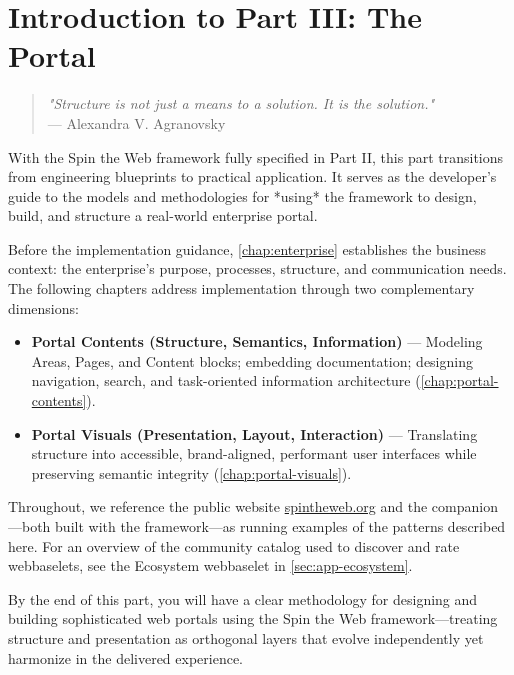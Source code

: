 \chapter*{Introduction to Part III: The Portal}
\label{part:implementation}

\begin{quote}
\textit{"Structure is not just a means to a solution. It is the solution."} \\
— Alexandra V. Agranovsky
\end{quote}

With the Spin the Web framework fully specified in Part II, this part transitions from engineering blueprints to practical application. It serves as the developer's guide to the models and methodologies for *using* the framework to design, build, and structure a real-world enterprise portal.

Before the implementation guidance, \cref{chap:enterprise} establishes the business context: the enterprise's purpose, processes, structure, and communication needs. The following chapters address implementation through two complementary dimensions:
\begin{itemize}
	\item \textbf{Portal Contents (Structure, Semantics, Information)} — Modeling Areas, Pages, and Content blocks; embedding documentation; designing navigation, search, and task-oriented information architecture (\cref{chap:portal-contents}).
	\item \textbf{Portal Visuals (Presentation, Layout, Interaction)} — Translating structure into accessible, brand-aligned, performant user interfaces while preserving semantic integrity (\cref{chap:portal-visuals}).
\end{itemize}

Throughout, we reference the public website \href{https://spintheweb.org}{spintheweb.org} and the companion \studio{}—both built with the framework—as running examples of the patterns described here. For an overview of the community catalog used to discover and rate webbaselets, see the Ecosystem webbaselet in \cref{sec:app-ecosystem}.

By the end of this part, you will have a clear methodology for designing and building sophisticated web portals using the Spin the Web framework—treating structure and presentation as orthogonal layers that evolve independently yet harmonize in the delivered experience.
